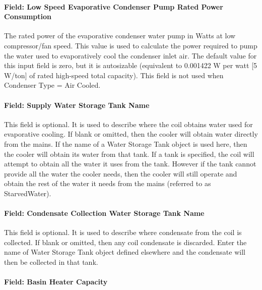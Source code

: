 \paragraph{Field: Low Speed Evaporative Condenser Pump Rated Power Consumption}\label{field-low-speed-evaporative-condenser-pump-rated-power-consumption}

The rated power of the evaporative condenser water pump in Watts at low compressor/fan speed. This value is used to calculate the power required to pump the water used to evaporatively cool the condenser inlet air. The default value for this input field is zero, but it is autosizable (equivalent to 0.001422 W per watt {[}5 W/ton{]} of rated high-speed total capacity). This field is not used when Condenser Type = Air Cooled.

\paragraph{Field: Supply Water Storage Tank Name}\label{field-supply-water-storage-tank-name-1-000}

This field is optional. It is used to describe where the coil obtains water used for evaporative cooling. If blank or omitted, then the cooler will obtain water directly from the mains. If the name of a Water Storage Tank object is used here, then the cooler will obtain its water from that tank. If a tank is specified, the coil will attempt to obtain all the water it uses from the tank. However if the tank cannot provide all the water the cooler needs, then the cooler will still operate and obtain the rest of the water it needs from the mains (referred to as StarvedWater).

\paragraph{Field: Condensate Collection Water Storage Tank Name}\label{field-condensate-collection-water-storage-tank-name-3}

This field is optional. It is used to describe where condensate from the coil is collected. If blank or omitted, then any coil condensate is discarded. Enter the name of Water Storage Tank object defined elsewhere and the condensate will then be collected in that tank.

\paragraph{Field: Basin Heater Capacity}\label{field-basin-heater-capacity-1-000}

